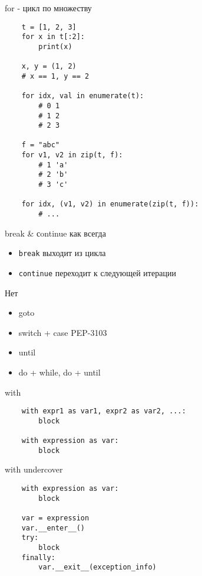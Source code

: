 \documentclass{article}
\begin{document}
\begin{center} for - цикл по множеству \end{center}
\vspace{15pt}
\begin{lstlisting}
	t = [1, 2, 3]
	for x in t[:2]:
		print(x)

	x, y = (1, 2)
	# x == 1, y == 2

	for idx, val in enumerate(t):
		# 0 1
		# 1 2
		# 2 3

	f = "abc"
	for v1, v2 in zip(t, f):
		# 1 'a'
		# 2 'b'
		# 3 'c'

	for idx, (v1, v2) in enumerate(zip(t, f)):
		# ...
\end{lstlisting}
\newpage
\begin{center} break \& сontinue как всегда \end{center}
\begin{itemize}
	\item \lstinline!break!  выходит из цикла
	\item \lstinline!continue! переходит к следующей итерации
\end{itemize}
\newpage

\begin{center} Нет \end{center}
\begin{itemize}
	\item goto 
	\item switch + case PEP-3103
	\item until 
	\item do + while, do + until
\end{itemize}
\newpage

\begin{center} with \end{center}
\vspace{15pt}
\begin{lstlisting}
	with expr1 as var1, expr2 as var2, ...:
		block

	with expression as var:
		block

\end{lstlisting}
\newpage

\begin{center} with undercover \end{center}
\vspace{15pt}
\begin{lstlisting}
	with expression as var:
		block

	var = expression
	var.__enter__()
	try:
		block
	finally:
		var.__exit__(exception_info)
\end{lstlisting}
\newpage
\end{document}
